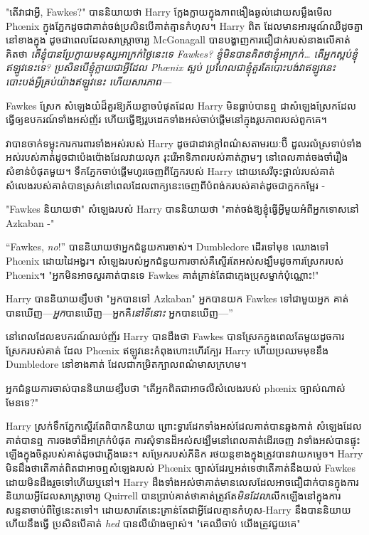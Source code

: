 {"តើវាជាអ្វី, Fawkes?" បាននិយាយថា Harry ក្លែងក្លាយក្នុងភាពងឿងឆ្ងល់ដោយសម្លឹងមើល Phœnix ក្នុងភ្នែកដូចជាគាត់ចង់ប្រសិនបើគាត់គ្មានកំហុស។ Harry ពិត ដែលមានអារម្មណ៍ឈឺដូចគ្នានៅខាងក្នុង ដូចជាពេលដែលសាស្រ្តាចារ្យ McGonagall បានបង្ហាញការជឿជាក់របស់នាងលើគាត់ គិតថា \emph{តើខ្ញុំបានប្រែក្លាយមនុស្សអាក្រក់ថ្ងៃនេះទេ Fawkes? ខ្ញុំ​មិន​បាន​គិត​ថា​ខ្ញុំ​អាក្រក់​… តើ​អ្នក​ស្អប់​ខ្ញុំ​ឥឡូវ​នេះ​ទេ? ប្រសិនបើខ្ញុំក្លាយជាអ្វីដែល Phœnix ស្អប់ ប្រហែលជាខ្ញុំគួរតែបោះបង់វាឥឡូវនេះ បោះបង់អ្វីគ្រប់យ៉ាងឥឡូវនេះ ហើយសារភាព—}

Fawkes ស្រែក សំឡេងយំដ៏គួរឱ្យភ័យខ្លាចបំផុតដែល Harry មិនធ្លាប់បានឮ ជាសំឡេងស្រែកដែលធ្វើឲ្យឧបករណ៍ទាំងអស់ញ័រ ហើយធ្វើឱ្យរូបដេកទាំងអស់ចាប់ផ្តើមនៅក្នុងរូបភាពរបស់ពួកគេ។

វាបានចាក់ទម្លុះការការពារទាំងអស់របស់ Harry ដូចជាដាវក្តៅពណ៌សតាមរយៈប៊ឺ ដួលរលំស្រទាប់ទាំងអស់របស់គាត់ដូចជាប៉េងប៉ោងដែលវាយលុក រុះរើអាទិភាពរបស់គាត់ភ្លាមៗ នៅពេលគាត់ចងចាំរឿងសំខាន់បំផុតមួយ។ ទឹកភ្នែកចាប់ផ្តើមហូរចេញពីភ្នែករបស់ Harry ដោយសេរីចុះថ្ពាល់របស់គាត់ សំលេងរបស់គាត់បានស្រក់នៅពេលដែលពាក្យនេះចេញពីបំពង់ករបស់គាត់ដូចជាក្អកកម្អែរ -

"Fawkes និយាយថា" សំឡេងរបស់ Harry បាននិយាយថា "គាត់ចង់ឱ្យខ្ញុំធ្វើអ្វីមួយអំពីអ្នកទោសនៅ Azkaban -"

“Fawkes, \emph{no}!” បាននិយាយថាអ្នកជំនួយការចាស់។ Dumbledore ដើរទៅមុខ ឈោងទៅ Phœnix ដោយដៃអង្វរ។ សំឡេង​របស់​អ្នក​ជំនួយការ​ចាស់​គឺ​ស្ទើរ​តែ​អស់សង្ឃឹម​ដូច​ការ​ស្រែក​របស់ Phœnix។ "អ្នកមិនអាចសួរគាត់បានទេ Fawkes គាត់គ្រាន់តែជាក្មេងប្រុសម្នាក់ប៉ុណ្ណោះ!"

Harry បាននិយាយខ្សឹបថា "អ្នកបានទៅ Azkaban" អ្នកបានយក Fawkes ទៅជាមួយអ្នក គាត់បានឃើញ—\emph{អ្នក}បានឃើញ—អ្នកគឺ\emph{នៅទីនោះ} អ្នកបានឃើញ—”

នៅពេលដែលឧបករណ៍ឈប់ញ័រ Harry បានដឹងថា Fawkes បានស្រែកក្នុងពេលតែមួយដូចការស្រែករបស់គាត់ ដែល Phœnix ឥឡូវនេះកំពុងហោះហើរក្បែរ Harry ហើយប្រឈមមុខនឹង Dumbledore នៅខាងគាត់ ដែលជាកម្រិតក្បាលពណ៌មាសក្រហម។

អ្នកជំនួយការចាស់បាននិយាយខ្សឹបថា "តើអ្នកពិតជាអាចលឺសំលេងរបស់ phœnix ច្បាស់ណាស់មែនទេ?"

Harry ស្រក់ទឹកភ្នែកស្ទើរតែពិបាកនិយាយ ព្រោះទ្វារដែកទាំងអស់ដែលគាត់បានឆ្លងកាត់ សំឡេងដែលគាត់បានឮ ការចងចាំដ៏អាក្រក់បំផុត ការសុំទានដ៏អស់សង្ឃឹមនៅពេលគាត់ដើរចេញ វាទាំងអស់បានផ្ទុះឡើងក្នុងចិត្តរបស់គាត់ដូចជាភ្លើងឆេះ។ សម្រែក​របស់​ភីនិក រថ​យន្ត​ខាង​ក្នុង​ត្រូវ​បាន​វាយ​កម្ទេច។ Harry មិន​ដឹង​ថា​តើ​គាត់​ពិតជា​អាច​ឮ​សំឡេង​របស់ Phœnix ច្បាស់​ដែរ​ឬ​អត់​ទេ​ថាតើ​គាត់​នឹង​យល់​ Fawkes ដោយ​មិន​ដឹង​រួច​ទៅ​ហើយ​ឬ​នៅ។ Harry ដឹងទាំងអស់ថាគាត់មានលេសដែលអាចជឿជាក់បានក្នុងការនិយាយអ្វីដែលសាស្រ្តាចារ្យ Quirrell បានប្រាប់គាត់ថាគាត់ត្រូវតែ\emph{មិនដែល}លើកឡើងនៅក្នុងការសន្ទនាចាប់ពីថ្ងៃនេះតទៅ។ ដោយសារតែនេះគ្រាន់តែជាអ្វីដែលគ្មានកំហុស-Harry នឹងបាននិយាយ ហើយនឹងធ្វើ ប្រសិនបើគាត់ \emph{hed} បានលឺយ៉ាងច្បាស់។ "គេឈឺចាប់ យើងត្រូវជួយគេ"

}
